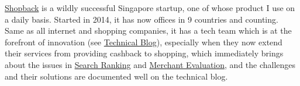 \documentclass{article}
\theoremstyle{plain}
\begin{document}
\href{https://corporate.shopback.com/}{Shopback} is a wildly successful
Singapore startup, one of whose product I use on a daily basis. Started in 2014,
it has now offices in 9 countries and counting. Same as all internet and
shopping companies, it has a tech team which is at the forefront of innovation
(see \href{https://medium.com/shopback-tech-blog}{Technical Blog}), especially
when they now extend their services from providing cashback to shopping, which
immediately brings about the issues in
\href{https://medium.com/shopback-tech-blog/build-ranking-in-a-real-world-search-application-random-thoughts-7d98df0996aa}{Search
  Ranking} and
\href{https://medium.com/shopback-tech-blog/part-1-merchants-recommendation-with-gru4rec-and-offline-evaluation-3235e6242d79}{Merchant
  Evaluation}, and the challenges and their solutions are documented well on the
technical blog.
\end{document}
